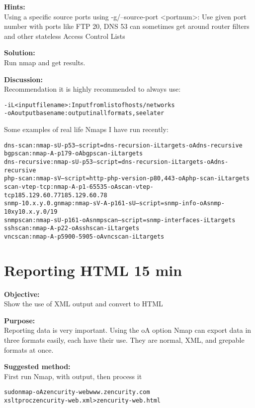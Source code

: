 \documentclass[a4paper,11pt,notitlepage]{report}
\begin{document}
{\bf Hints:} \\
Using a specific source ports using -g/--source-port <portnum>: Use given port number with ports like FTP 20, DNS 53 can sometimes get around router filters and other stateless Access Control Lists

{\bf Solution:}\\
Run nmap and get results.

{\bf Discussion:}\\
Recommendation it is highly recommended to always use:
\begin{alltt}
-iL <inputfilename>: Input from list of hosts/networks
-oA outputbasename: output in all formats, see later
\end{alltt}

Some examples of real life Nmaps I have run recently:
\begin{alltt}
dns-scan: nmap -sU -p 53 --script=dns-recursion -iL targets -oA dns-recursive
bgpscan: nmap -A -p 179 -oA bgpscan -iL targets
dns-recursive: nmap -sU -p 53 --script=dns-recursion -iL targets -oA dns-recursive
php-scan: nmap -sV --script=http-php-version -p80,443 -oA php-scan -iL targets
scan-vtep-tcp: nmap -A -p 1-65535 -oA scan-vtep-tcp 185.129.60.77 185.129.60.78
snmp-10.x.y.0.gnmap: nmap -sV -A -p 161 -sU --script=snmp-info -oA snmp-10xy 10.x.y.0/19
snmpscan: nmap -sU -p 161 -oA snmpscan --script=snmp-interfaces -iL targets
sshscan: nmap -A -p 22 -oA sshscan -iL targets
vncscan: nmap -A -p 5900-5905 -oA vncscan -iL targets
\end{alltt}




\chapter{Reporting HTML 15 min}
\label{ex:nmap-html}


{\bf Objective:} \\
Show the use of XML output and convert to HTML

{\bf Purpose:}\\
Reporting data is very important. Using the oA option Nmap can export data in three formats easily, each have their use. They are normal, XML, and grepable formats at once.

{\bf Suggested method:}\\
First run Nmap, with output, then process it
\begin{alltt}
  sudo nmap -oA zencurity-web www.zencurity.com
  xsltproc zencurity-web.xml > zencurity-web.html
\end{alltt}
\end{document}
